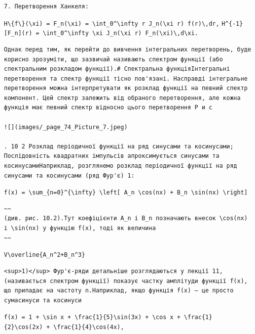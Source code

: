 \documentclass[
  ukrainian,
]{article}
\begin{document}
\begin{verbatim}
7. Перетворення Ханкеля:
\end{verbatim}

\texttt{H\textbackslash{}\{f\textbackslash{}\}(\textbackslash{}xi)\ =\ F\_n(\textbackslash{}xi)\ =\ \textbackslash{}int\_0\^{}\textbackslash{}infty\ r\ J\_n(\textbackslash{}xi\ r)\ f(r)\textbackslash{},dr,}
\texttt{H\^{}\{-1\}{[}F\_n{]}(r)\ =\ \textbackslash{}int\_0\^{}\textbackslash{}infty\ \textbackslash{}xi\ J\_n(\textbackslash{}xi\ r)\ F\_n(\textbackslash{}xi)\textbackslash{},d\textbackslash{}xi.}

\begin{verbatim}
Однак перед тим, як перейти до вивчення інтегральних перетворень, буде корисно зрозуміти, що зазвичай називають спектром функції (або спектральним розкладом функції).# Спектральна функціяІнтегральні перетворення та спектр функції тісно пов'язані. Насправді інтегральне перетворення можна інтерпретувати як розклад функції на певний спектр компонент. Цей спектр залежить від обраного перетворення, але кожна функція має певний спектр відносно цього перетворення Р и с

![](images/_page_74_Picture_7.jpeg)

. 10 2 Розклад періодичної функції на ряд синусами та косинусами; Послідовність квадратних імпульсів апроксимується синусами та косинусамиНаприклад, розглянемо розклад періодичної функції на ряд синусами та косинусами (ряд Фур'є) 1:
\end{verbatim}

\texttt{f(x)\ =\ \textbackslash{}sum\_\{n=0\}\^{}\{\textbackslash{}infty\}\ \textbackslash{}left{[}\ A\_n\ \textbackslash{}cos(nx)\ +\ B\_n\ \textbackslash{}sin(nx)\ \textbackslash{}right{]}}

\begin{verbatim}
~~
(див. рис. 10.2).Тут коефіцієнти A_n і B_n позначають внесок \cos(nx) і \sin(nx) у функцію f(x), тоді як величина
~~
\end{verbatim}

\texttt{V\textbackslash{}overline\{A\_n\^{}2+B\_n\^{}3\}}

\begin{verbatim}
<sup>1)</sup> Фур'є-ряди детальніше розглядаються у лекції 11,(називається спектром функції) показує частку амплітуди функції f(x), що припадає на частоту n.Наприклад, якщо функція f(x) — це просто сумасинуси та косинуси
\end{verbatim}

\texttt{f(x)\ =\ 1\ +\ \textbackslash{}sin\ x\ +\ \textbackslash{}frac\{1\}\{5\}\textbackslash{}sin(3x)\ +\ \textbackslash{}cos\ x\ +\ \textbackslash{}frac\{1\}\{2\}\textbackslash{}cos(2x)\ +\ \textbackslash{}frac\{1\}\{4\}\textbackslash{}cos(4x),}
\end{document}
